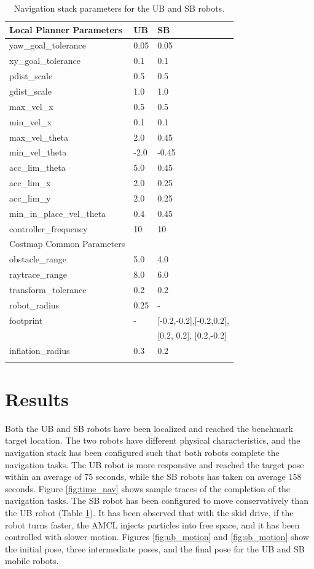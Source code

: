 \documentclass[10pt,journal,compsoc]{IEEEtran}
\begin{document}
\begin{table}[h]
\caption{Navigation stack parameters for the UB and SB robots.}
\label{tab:planner}
\begin{center}
\begin{tabular}{|l||l|l|}
\hline
Local Planner Parameters & UB & SB\\
\hline
yaw\_goal\_tolerance &  0.05& 0.05\\
xy\_goal\_tolerance &  0.1& 0.1\\
pdist\_scale &  0.5& 0.5\\
gdist\_scale &  1.0& 1.0\\
max\_vel\_x &  0.5& 0.5\\
min\_vel\_x &  0.1& 0.1\\
max\_vel\_theta & 2.0 & 0.45\\
min\_vel\_theta &  -2.0& -0.45\\
acc\_lim\_theta &  5.0& 0.45\\
acc\_lim\_x & 2.0 & 0.25\\
acc\_lim\_y &  2.0& 0.25\\
min\_in\_place\_vel\_theta & 0.4 & 0.45\\
controller\_frequency &  10& 10\\
\hline
Costmap Common Parameters && \\
\hline
obstacle\_range  & 5.0 & 4.0 \\
raytrace\_range & 8.0 & 6.0\\
transform\_tolerance & 0.2 & 0.2\\
robot\_radius &  0.25& -\\
footprint &  - & [-0.2,-0.2],[-0.2,0.2],\\  
 &  &  [0.2, 0.2], [0.2,-0.2]\\
inflation\_radius & 0.3 & 0.2\\  
  &  & \\              
\hline
\end{tabular}
\end{center}
\end{table}



\section{Results}

Both the UB and SB robots have been localized and reached the benchmark target location. The two robots have different  physical characteristics, and the navigation stack has been configured such that both robots complete the navigation tasks. The UB robot is more responsive and reached the target pose within an average of 75 seconds, while the SB robots has taken on average 158 seconds. Figure \ref{fig:time_nav} shows sample traces of the completion of the navigation tasks. The SB robot has been configured to move conservatively than the UB robot (Table \ref{tab:planner}). It has been observed that with the skid drive, if the robot turns faster, the AMCL  injects particles into free space, and it has been controlled with slower motion. Figures \ref{fig:ub_motion} and \ref{fig:sb_motion} show the initial pose, three intermediate poses, and the final pose for the UB  and SB mobile robots.    
\end{document}
